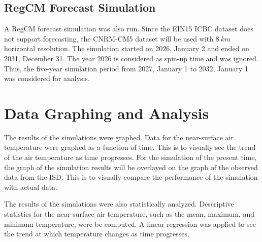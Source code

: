 	\subsection{RegCM Forecast Simulation}
		A RegCM forecast simulation was also run.
		Since the EIN15 ICBC dataset does not support forecasting,
		the CNRM-CM5 dataset will be used with $\qty{8}{km}$ horizontal resolution.
		The simulation started on 2026, January 2 and ended on 2031, December 31.
		The year 2026 is considered as spin-up time and was ignored.
		Thus, the five-year simulation period from 2027, January 1 to 2032, January 1 was considered for analysis.
		
		
		
		
	
	
	
	

\section{Data Graphing and Analysis}
	The results of the simulations were graphed.
	Data for the near-surface air temperature were graphed as a function of time.
	This is to visually see the trend of the air temperature as time progresses.
	For the simulation of the present time, the graph of the simulation results will be overlayed on the graph of the observed data from the ISD.
	This is to visually compare the performance of the simulation with actual data.
	
	The results of the simulations were also statistically analyzed.
	Descriptive statistics for the near-surface air temperature, such as the mean, maximum, and minimum temperature, were be computed.
	A linear regression was applied to see the trend at which temperature changes as time progresses.